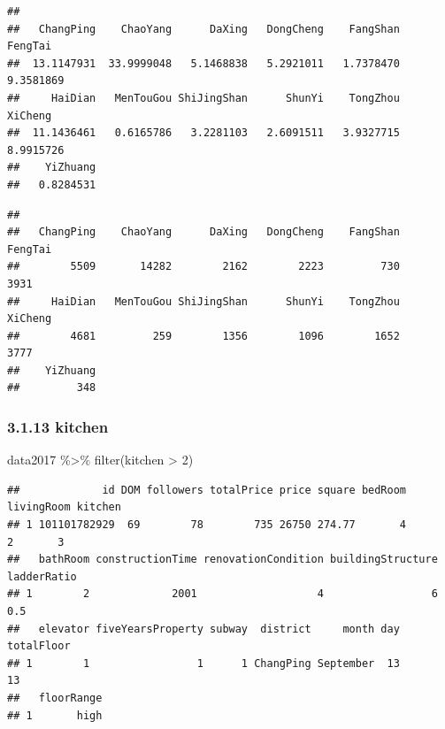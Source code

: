 \documentclass[
]{article}
\newenvironment{Shaded}{\begin{snugshade}}{\end{snugshade}}
\newcommand{\DecValTok}[1]{\textcolor[rgb]{0.00,0.00,0.81}{#1}}
\newcommand{\FunctionTok}[1]{\textcolor[rgb]{0.00,0.00,0.00}{#1}}
\newcommand{\NormalTok}[1]{#1}
\newcommand{\SpecialCharTok}[1]{\textcolor[rgb]{0.00,0.00,0.00}{#1}}
\begin{document}
\begin{Shaded}
\end{Shaded}

\begin{verbatim}
## 
##   ChangPing    ChaoYang      DaXing   DongCheng    FangShan     FengTai 
##  13.1147931  33.9999048   5.1468838   5.2921011   1.7378470   9.3581869 
##     HaiDian   MenTouGou ShiJingShan      ShunYi    TongZhou     XiCheng 
##  11.1436461   0.6165786   3.2281103   2.6091511   3.9327715   8.9915726 
##    YiZhuang 
##   0.8284531
\end{verbatim}

\begin{Shaded}
\end{Shaded}

\begin{verbatim}
## 
##   ChangPing    ChaoYang      DaXing   DongCheng    FangShan     FengTai 
##        5509       14282        2162        2223         730        3931 
##     HaiDian   MenTouGou ShiJingShan      ShunYi    TongZhou     XiCheng 
##        4681         259        1356        1096        1652        3777 
##    YiZhuang 
##         348
\end{verbatim}

\hypertarget{kitchen}{%
\subsubsection{3.1.13 kitchen}\label{kitchen}}

\begin{Shaded}
\begin{Highlighting}[]
\NormalTok{data2017 }\SpecialCharTok{\%\textgreater{}\%} 
  \FunctionTok{filter}\NormalTok{(kitchen }\SpecialCharTok{\textgreater{}} \DecValTok{2}\NormalTok{) }
\end{Highlighting}
\end{Shaded}

\begin{verbatim}
##             id DOM followers totalPrice price square bedRoom livingRoom kitchen
## 1 101101782929  69        78        735 26750 274.77       4          2       3
##   bathRoom constructionTime renovationCondition buildingStructure ladderRatio
## 1        2             2001                   4                 6         0.5
##   elevator fiveYearsProperty subway  district     month day totalFloor
## 1        1                 1      1 ChangPing September  13         13
##   floorRange
## 1       high
\end{verbatim}
\end{document}
